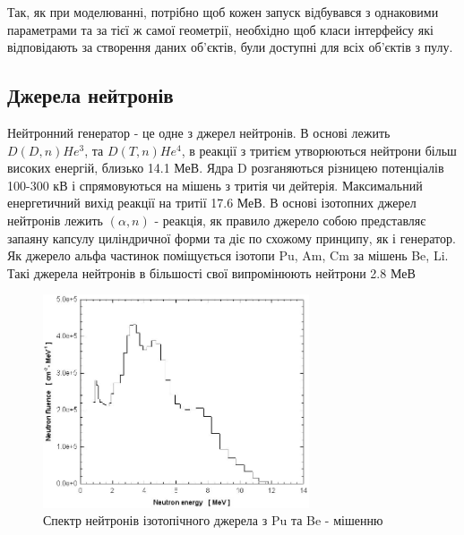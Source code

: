 \documentclass[a4paper, 14pt]{article}
\numberwithin{equation}{section}
\numberwithin{table}{section}
\begin{document}
Так, як при моделюванні, потрібно щоб кожен запуск відбувався з однаковими параметрами та за тієї ж самої геометрії, необхідно щоб класи інтерфейсу які відповідають за створення даних об'єктів, були доступні для всіх об'єктів з пулу.
	
\subsection{Джерела нейтронів}
Нейтронний генератор - це одне з джерел нейтронів. В основі лежить $D(D,n)He^3 $, та $D(T, n)He^4$, в реакції з тритієм утворюються нейтрони більш високих енергій, близько 14.1 МеВ. Ядра D розганяються різницею потенціалів 100-300 кВ і спрямовуються на мішень з тритія чи дейтерія. Максимальний енергетичний вихід реакції на тритії 17.6 МеВ. 
В основі ізотопних джерел нейтронів лежить $(\alpha, n)$ - реакція, як правило джерело собою представляє запаяну капсулу циліндричної форми та діє по схожому принципу, як і генератор. Як джерело альфа частинок поміщується ізотопи Pu, Am, Cm за мішень Be, Li. Такі джерела нейтронів в більшості свої випромінюють нейтрони 2.8 МеВ
\begin{figure}[hbt!]
	\centering \includegraphics[width=0.7\textwidth]{images/239-PuBe-neutron-source-spectrum.png}
	\caption{Спектр нейтронів ізотопічного джерела з Pu та Be - мішенню} 
	\label{ris:neutron28Spectrum}	
\end{figure}
\newpage
\end{document}
